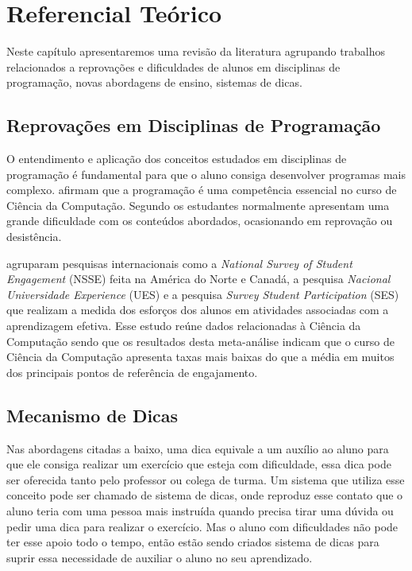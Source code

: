 \chapter{Referencial Teórico}

Neste capítulo apresentaremos uma revisão da literatura agrupando trabalhos relacionados a reprovações e dificuldades de alunos em disciplinas de programação, novas abordagens de ensino, sistemas de dicas. 

\section{Reprovações em Disciplinas de Programação}

O entendimento e aplicação dos conceitos estudados em disciplinas de programação é fundamental para que o aluno consiga desenvolver programas mais complexo.  afirmam que a programação é uma competência essencial no curso de Ciência da Computação. Segundo  os estudantes normalmente apresentam uma grande dificuldade com os conteúdos abordados, ocasionando em reprovação ou desistência.


 agruparam pesquisas internacionais como a \textit{National Survey of Student Engagement} (NSSE) feita na América do Norte e Canadá, a pesquisa \textit{Nacional Universidade Experience} (UES) e a pesquisa \textit{Survey Student Participation} (SES) que realizam a medida dos esforços dos alunos em atividades associadas com a aprendizagem efetiva. Esse estudo reúne dados relacionadas à Ciência da Computação sendo que os resultados desta meta-análise indicam que o curso de Ciência da Computação apresenta taxas mais baixas do que a média em muitos dos principais pontos de referência de engajamento.

\section{Mecanismo de Dicas}


Nas abordagens citadas a baixo, uma dica equivale a um auxílio ao aluno para que ele consiga realizar um exercício que esteja com dificuldade, essa dica pode ser oferecida tanto pelo professor ou colega de turma. Um sistema que utiliza esse conceito pode ser chamado de sistema de dicas, onde reproduz esse contato que o aluno teria com uma pessoa mais instruída quando precisa tirar uma dúvida ou pedir uma dica para realizar o exercício. Mas o aluno com dificuldades não pode ter esse apoio todo o tempo, então estão sendo criados sistema de dicas para suprir essa necessidade de auxiliar o aluno no seu aprendizado. 


